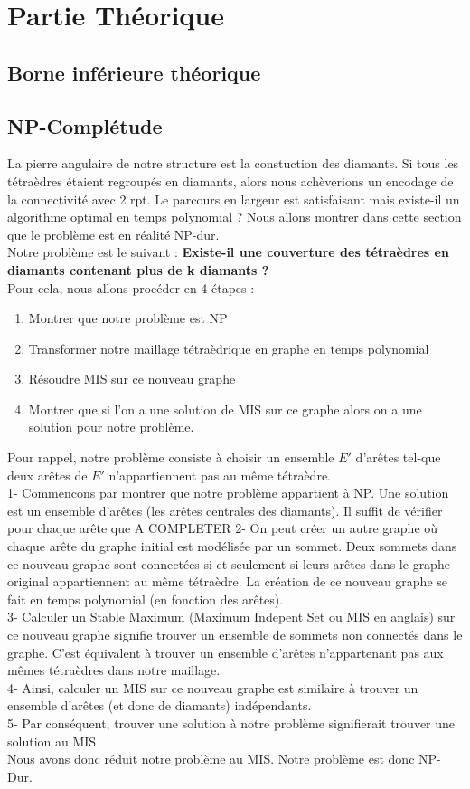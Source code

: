 \section{Partie Théorique}
\subsection{Borne inférieure théorique}
\subsection{NP-Complétude}
\noindent
La pierre angulaire de notre structure est la constuction des diamants. Si tous les tétraèdres étaient regroupés en diamants, alors nous achèverions un encodage de la connectivité avec 2 rpt. Le parcours en largeur est satisfaisant mais existe-il un algorithme optimal en temps polynomial ? Nous allons montrer dans cette section que le problème est en réalité NP-dur.\\
Notre problème est le suivant : \textbf{Existe-il une couverture des tétraèdres en diamants contenant plus de k diamants ?}\\
Pour cela, nous allons procéder en 4 étapes :
\begin{enumerate}
\item Montrer que notre problème est NP
\item Transformer notre maillage tétraèdrique en graphe en temps polynomial
\item Résoudre MIS sur ce nouveau graphe
\item Montrer que si l'on a une solution de MIS sur ce graphe alors on a une solution pour notre problème.
\end{enumerate}
Pour rappel, notre problème consiste à choisir un ensemble $E'$ d'arêtes tel-que deux arêtes de $E'$ n'appartiennent pas au même tétraèdre.\\
1- Commencons par montrer que notre problème appartient à NP. Une solution est un ensemble d'arêtes (les arêtes centrales des diamants). Il suffit de vérifier pour chaque arête que A COMPLETER
2- On peut créer un autre graphe où chaque arête du graphe initial est modélisée par un sommet. Deux sommets dans ce nouveau graphe sont connectées si et seulement si leurs arêtes dans le graphe original appartiennent au même tétraèdre. La création de ce nouveau graphe se fait en temps polynomial (en fonction des arêtes).\\
3- Calculer un Stable Maximum (Maximum Indepent Set ou MIS en anglais) sur ce nouveau graphe signifie trouver un ensemble de sommets non connectés dans le graphe. C'est équivalent à trouver un ensemble d'arêtes n'appartenant pas aux mêmes tétraèdres dans notre maillage.\\
4- Ainsi, calculer un MIS sur ce nouveau graphe est similaire à trouver un ensemble d'arêtes (et donc de diamants) indépendants.\\
5- Par conséquent, trouver une solution à notre problème signifierait trouver une solution au MIS\\
Nous avons donc réduit notre problème au MIS. Notre problème est donc NP-Dur.